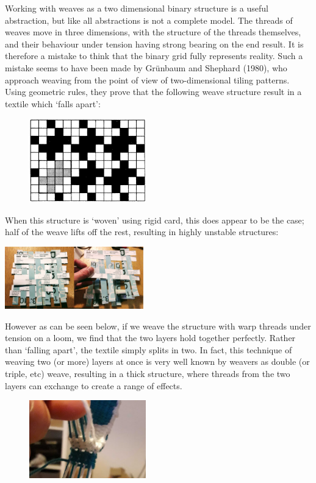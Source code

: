 \documentclass{nime-alternate} %
\begin{document}
Working with weaves as a two dimensional binary structure is a useful
abstraction, but like all abstractions is not a complete model. The
threads of weaves move in three dimensions, with the structure of the
threads themselves, and their behaviour under tension having strong
bearing on the end result. It is therefore a mistake to think that the
binary grid fully represents reality. Such a mistake seems to have been
made by Grünbaum and Shephard (1980), who approach weaving from the
point of view of two-dimensional tiling patterns. Using geometric rules,
they prove that the following weave structure result in a textile which
`falls apart':

\begin{figure}[h]
\includegraphics[width=0.45\textwidth]{grafik1.png}
\end{figure}

When this structure is `woven' using rigid card, this does appear to be
the case; half of the weave lifts off the rest, resulting in highly
unstable structures:

\includegraphics[width=0.45\textwidth]{card.png}

However as can be seen below, if we weave the structure with warp
threads under tension on a loom, we find that the two layers hold
together perfectly. Rather than `falling apart', the textile simply
splits in two. In fact, this technique of weaving two (or more) layers
at once is very well known by weavers as double (or triple, etc) weave,
resulting in a thick structure, where threads from the two layers can
exchange to create a range of effects.

\begin{figure}[h]
\includegraphics[width=0.45\textwidth]{weave.jpg}
\end{figure}
\end{document}
